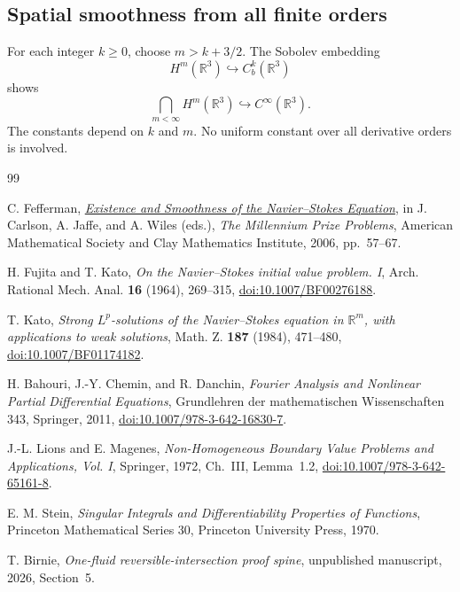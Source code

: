 \documentclass[11pt]{article}
\theoremstyle{definition}
\theoremstyle{remark}
\newcommand{\R}{\mathbb R}
\begin{document}
\subsection{Spatial smoothness from all finite orders}

For each integer \(k\geq0\), choose \(m>k+3/2\).  The Sobolev embedding
\[
 H^m(\R^3)\hookrightarrow C_b^k(\R^3)
\]
shows
\[
 \bigcap_{m<\infty}H^m(\R^3)\hookrightarrow C^\infty(\R^3).
\]
The constants depend on \(k\) and \(m\).  No uniform constant over all
derivative orders is involved.

\begin{thebibliography}{99}
\small
\setlength{\itemsep}{3pt}

C. Fefferman,
\href{https://www.claymath.org/wp-content/uploads/2022/06/navierstokes.pdf}
{\emph{Existence and Smoothness of the Navier--Stokes Equation}},
in J. Carlson, A. Jaffe, and A. Wiles (eds.),
\emph{The Millennium Prize Problems}, American Mathematical Society and
Clay Mathematics Institute, 2006, pp.~57--67.

H. Fujita and T. Kato,
\emph{On the Navier--Stokes initial value problem. I},
Arch. Rational Mech. Anal. \textbf{16} (1964), 269--315,
\href{https://doi.org/10.1007/BF00276188}{doi:10.1007/BF00276188}.

T. Kato,
\emph{Strong \(L^p\)-solutions of the Navier--Stokes equation in
\(\R^m\), with applications to weak solutions},
Math. Z. \textbf{187} (1984), 471--480,
\href{https://doi.org/10.1007/BF01174182}{doi:10.1007/BF01174182}.

H. Bahouri, J.-Y. Chemin, and R. Danchin,
\emph{Fourier Analysis and Nonlinear Partial Differential Equations},
Grundlehren der mathematischen Wissenschaften 343, Springer, 2011,
\href{https://doi.org/10.1007/978-3-642-16830-7}
{doi:10.1007/978-3-642-16830-7}.

J.-L. Lions and E. Magenes,
\emph{Non-Homogeneous Boundary Value Problems and Applications, Vol. I},
Springer, 1972, Ch.~III, Lemma~1.2,
\href{https://doi.org/10.1007/978-3-642-65161-8}
{doi:10.1007/978-3-642-65161-8}.

E. M. Stein,
\emph{Singular Integrals and Differentiability Properties of Functions},
Princeton Mathematical Series 30, Princeton University Press, 1970.

T. Birnie,
\emph{One-fluid reversible-intersection proof spine},
unpublished manuscript, 2026, Section~5.

\end{thebibliography}
\end{document}
